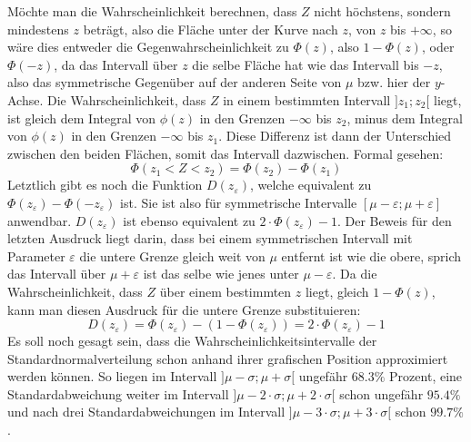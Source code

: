 M\"{o}chte man die Wahrscheinlichkeit berechnen, dass $Z$ nicht h\"{o}chstens, sondern mindestens $z$ betr\"{a}gt, also die Fl\"{a}che unter der Kurve nach $z$, von $z$ bis $+\infty$, so w\"{a}re dies entweder die Gegenwahrscheinlichkeit zu $\Phi(z)$, also $1 - \Phi(z)$, oder $\Phi(-z)$, da das Intervall \"{u}ber $z$ die selbe Fl\"{a}che hat wie das Intervall bis $-z$, also das symmetrische Gegen\"{u}ber auf der anderen Seite von $\mu$ bzw. hier der $y$-Achse. Die Wahrscheinlichkeit, dass $Z$ in einem bestimmten Intervall $]z_{1}; z_{2}[$ liegt, ist gleich dem Integral von $\phi(z)$ in den Grenzen $-\infty$ bis $z_2$, minus dem Integral von $\phi(z)$ in den Grenzen $-\infty$ bis $z_1$. Diese Differenz ist dann der Unterschied zwischen den beiden Fl\"{a}chen, somit das Intervall dazwischen. Formal gesehen: $$\Phi(z_{1} < Z < z_{2}) = \Phi(z_{2}) - \Phi(z_{1})$$  Letztlich gibt es noch die Funktion $D(z_{\varepsilon})$, welche equivalent zu $\Phi(z_{\varepsilon}) - \Phi(-z_{\varepsilon})$ ist. Sie ist also f\"{u}r symmetrische Intervalle $[\mu - \varepsilon ;  \mu + \varepsilon]$ anwendbar. $D(z_{\varepsilon})$ ist ebenso equivalent zu $2 \cdot \Phi(z_{\varepsilon}) - 1$. Der Beweis f\"{u}r den letzten Ausdruck liegt darin, dass bei einem symmetrischen Intervall mit Parameter $\varepsilon$ die untere Grenze gleich weit von $\mu$ entfernt ist wie die obere, sprich das Intervall \"{u}ber $\mu + \varepsilon$ ist das selbe wie jenes unter $\mu - \varepsilon$. Da die Wahrscheinlichkeit, dass $Z$ \"{u}ber einem bestimmten $z$ liegt, gleich $1 - \Phi(z)$, kann man diesen Ausdruck f\"{u}r die untere Grenze substituieren: $$D(z_{\varepsilon}) = \Phi(z_{\varepsilon}) - (1 - \Phi(z_{\varepsilon})) = 2 \cdot \Phi(z_{\varepsilon}) - 1$$ Es soll noch gesagt sein, dass die Wahrscheinlichkeitsintervalle der Standardnormalverteilung schon anhand ihrer grafischen Position approximiert werden k\"{o}nnen. So liegen im Intervall $]\mu - \sigma ; \mu + \sigma[$ ungef\"{a}hr $68.3 \%$ Prozent, eine Standardabweichung weiter im Intervall $]\mu - 2 \cdot \sigma ; \mu + 2 \cdot \sigma[$ schon ungef\"{a}hr $95.4 \%$ und nach drei Standardabweichungen im Intervall $]\mu - 3 \cdot \sigma ; \mu + 3 \cdot \sigma[$ schon $99.7 \%$.

